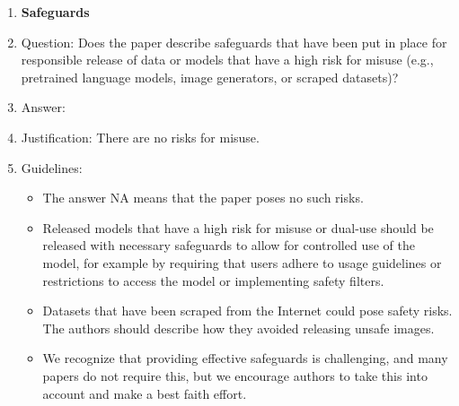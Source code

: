 \documentclass{article}
\begin{document}
\begin{enumerate}
\item {\bf Safeguards}
    \item[] Question: Does the paper describe safeguards that have been put in place for responsible release of data or models that have a high risk for misuse (e.g., pretrained language models, image generators, or scraped datasets)?
    \item[] Answer: \answerNA{} %
    \item[] Justification: There are no risks for misuse. 
    \item[] Guidelines:
    \begin{itemize}
        \item The answer NA means that the paper poses no such risks.
        \item Released models that have a high risk for misuse or dual-use should be released with necessary safeguards to allow for controlled use of the model, for example by requiring that users adhere to usage guidelines or restrictions to access the model or implementing safety filters. 
        \item Datasets that have been scraped from the Internet could pose safety risks. The authors should describe how they avoided releasing unsafe images.
        \item We recognize that providing effective safeguards is challenging, and many papers do not require this, but we encourage authors to take this into account and make a best faith effort.
    \end{itemize}


\end{enumerate}
\end{document}
